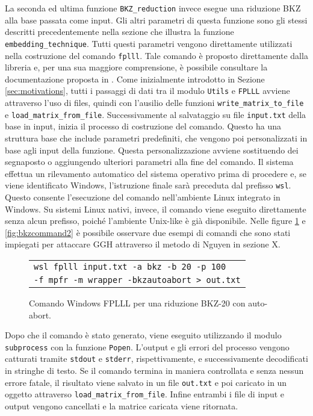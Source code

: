 La seconda ed ultima funzione \texttt{BKZ\_reduction} invece esegue una riduzione BKZ alla 
base passata come input. Gli altri parametri di questa funzione sono gli stessi 
descritti precedentemente nella sezione che illustra la funzione \texttt{embedding\_technique}. 
Tutti questi parametri vengono direttamente utilizzati nella costruzione del comando 
\texttt{fplll}. Tale comando è proposto direttamente dalla libreria e, per una sua 
maggiore comprensione, è possibile consultare la documentazione proposta in \cite{FPLLL}.
Come inizialmente introdotto in Sezione \ref{sec:motivations}, tutti i passaggi di dati 
tra il modulo \texttt{Utils} e \texttt{FPLLL} avviene attraverso l'uso di files, quindi 
con l'ausilio delle funzioni \texttt{write\_matrix\_to\_file} e \texttt{load\_matrix\_from\_file}.
Successivamente al salvataggio su file \texttt{input.txt} della base in input, inizia
il processo di costruzione del comando. 
Questo ha una struttura base che include parametri predefiniti, che vengono poi personalizzati 
in base agli input della funzione. Questa personalizzazione avviene sostituendo dei 
segnaposto o aggiungendo ulteriori parametri alla fine del comando. 
Il sistema effettua un rilevamento automatico del sistema operativo prima di procedere e,  
se viene identificato Windows, l'istruzione finale sarà preceduta dal prefisso \texttt{wsl}. 
Questo consente l'esecuzione del comando nell'ambiente Linux integrato in Windows. 
Su sistemi Linux nativi, invece, il comando viene eseguito 
direttamente senza alcun prefisso, poiché l'ambiente Unix-like è già disponibile.
Nelle figure 
\ref{fig:bkzcommand1} e \ref{fig:bkzcommand2} è possibile osservare due esempi di comandi
che sono stati impiegati per attaccare GGH attraverso il metodo di Nguyen in sezione X.  


\begin{figure}[h]
    \centering
    \begin{tabular}{l}
        \texttt{wsl fplll input.txt -a bkz -b 20 -p 100} \\
        \texttt{-f mpfr -m wrapper -bkzautoabort > out.txt}
    \end{tabular}
    \caption{Comando Windows FPLLL per una riduzione BKZ-20 con auto-abort.}
    \label{fig:bkzcommand1}
\end{figure}

Dopo che il comando è stato generato, viene eseguito utilizzando il modulo \texttt{subprocess}
con la funzione \texttt{Popen}. 
L'output e gli errori del processo vengono catturati tramite \texttt{stdout} e \texttt{stderr}, 
rispettivamente, e successivamente decodificati in stringhe di testo.
Se il comando termina in maniera controllata e senza nessun errore fatale, il risultato
viene salvato in un file \texttt{out.txt} e poi caricato in un oggetto attraverso
\texttt{load\_matrix\_from\_file}. 
Infine entrambi i file di input e output vengono cancellati e la matrice caricata viene
ritornata. 

